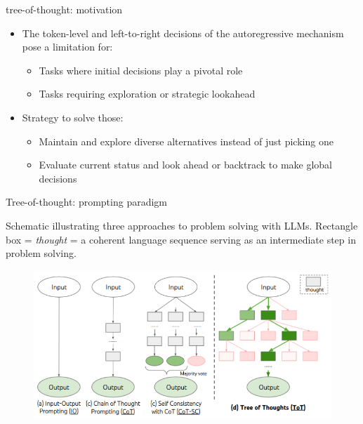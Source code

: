 
\begin{vbframe}{tree-of-thought: motivation}

\vfill

\begin{itemize}
\item The token-level and left-to-right decisions of the autoregressive mechanism pose a limitation for:
    \begin{itemize}
    \item Tasks where initial decisions play a pivotal role
    \item Tasks requiring exploration or strategic lookahead
    \end{itemize}
\item Strategy to solve those:
    \begin{itemize}
    \item Maintain and explore diverse alternatives instead of just picking one
    \item Evaluate current status and look ahead or backtrack to make global decisions
    \end{itemize}

\end{itemize}

\vfill

\end{vbframe}


\begin{vbframe}{Tree-of-thought: prompting paradigm}

\vfill

Schematic illustrating three approaches to problem solving
with LLMs. Rectangle box = \textit{thought} = a coherent language sequence serving as an intermediate step in problem solving.

\begin{figure}
    \centering
    \includegraphics{figure/tot_vs_cot.png}\\
\end{figure}

\vfill

\end{vbframe}

